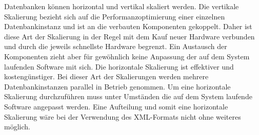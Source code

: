 Datenbanken können horizontal und vertikal skaliert werden. Die vertikale Skalierung bezieht sich auf die Performanzoptimierung einer einzelnen Datenbankinstanz und ist an die verbauten Komponenten gekoppelt. Daher ist diese Art der Skalierung in der Regel mit dem Kauf neuer Hardware verbunden und durch die jeweils schnellste Hardware begrenzt. Ein Austausch der Komponenten zieht aber für gewöhnlich keine Anpassung der auf dem System laufenden Software mit sich. 
Die horizontale Skalierung ist effektiver und kostengünstiger. Bei dieser Art der Skalierungen werden mehrere Datenbankinstanzen parallel in Betrieb genommen. Um eine horizontale Skalierung durchzuführen muss unter Umständen die auf dem System laufende Software angepasst werden. \cite{doi:10.1108/17440081311316398}
Eine Aufteilung und somit eine horizontale Skalierung wäre bei der Verwendung des XML-Formats nicht ohne weiteres möglich. 





